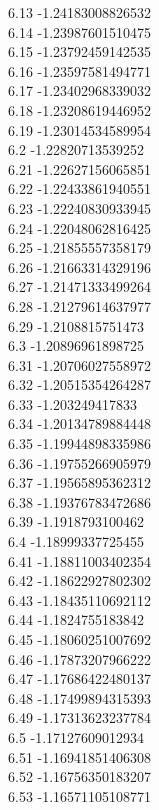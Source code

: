 {6.13	-1.24183008826532\\
6.14	-1.23987601510475\\
6.15	-1.23792459142535\\
6.16	-1.23597581494771\\
6.17	-1.23402968339032\\
6.18	-1.23208619446952\\
6.19	-1.23014534589954\\
6.2	-1.22820713539252\\
6.21	-1.22627156065851\\
6.22	-1.22433861940551\\
6.23	-1.22240830933945\\
6.24	-1.22048062816425\\
6.25	-1.21855557358179\\
6.26	-1.21663314329196\\
6.27	-1.21471333499264\\
6.28	-1.21279614637977\\
6.29	-1.2108815751473\\
6.3	-1.20896961898725\\
6.31	-1.20706027558972\\
6.32	-1.20515354264287\\
6.33	-1.203249417833\\
6.34	-1.20134789884448\\
6.35	-1.19944898335986\\
6.36	-1.19755266905979\\
6.37	-1.19565895362312\\
6.38	-1.19376783472686\\
6.39	-1.1918793100462\\
6.4	-1.18999337725455\\
6.41	-1.18811003402354\\
6.42	-1.18622927802302\\
6.43	-1.18435110692112\\
6.44	-1.1824755183842\\
6.45	-1.18060251007692\\
6.46	-1.17873207966222\\
6.47	-1.17686422480137\\
6.48	-1.17499894315393\\
6.49	-1.17313623237784\\
6.5	-1.17127609012934\\
6.51	-1.16941851406308\\
6.52	-1.16756350183207\\
6.53	-1.16571105108771\\
}
